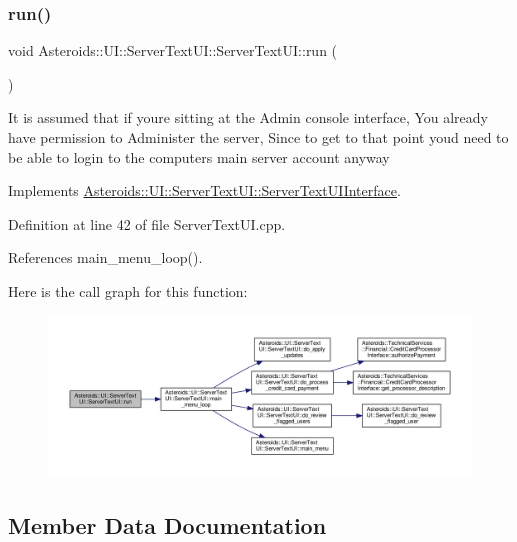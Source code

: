 \subsubsection{\texorpdfstring{run()}{run()}}
{\footnotesize\ttfamily void Asteroids\+::\+U\+I\+::\+Server\+Text\+U\+I\+::\+Server\+Text\+U\+I\+::run (\begin{DoxyParamCaption}{ }\end{DoxyParamCaption})\hspace{0.3cm}{\ttfamily [virtual]}}

It is assumed that if you\textquotesingle{}re sitting at the Admin console interface, You already have permission to Administer the server, Since to get to that point you\textquotesingle{}d need to be able to login to the computer\textquotesingle{}s main server account anyway 

Implements \hyperlink{classAsteroids_1_1UI_1_1ServerTextUI_1_1ServerTextUIInterface_a81f61d1e1c051c0f83fe716fee7247d3}{Asteroids\+::\+U\+I\+::\+Server\+Text\+U\+I\+::\+Server\+Text\+U\+I\+Interface}.



Definition at line 42 of file Server\+Text\+U\+I.\+cpp.



References main\+\_\+menu\+\_\+loop().

Here is the call graph for this function\+:\nopagebreak
\begin{figure}[H]
\begin{center}
\leavevmode
\includegraphics[width=350pt]{classAsteroids_1_1UI_1_1ServerTextUI_1_1ServerTextUI_a92fb489434b5bd2a9e91f5d77c9832ac_cgraph}
\end{center}
\end{figure}


\subsection{Member Data Documentation}
\mbox{\label{classAsteroids_1_1UI_1_1ServerTextUI_1_1ServerTextUI_acd6e888ebaae2720b7ee2c0ba4a48d57}} 

